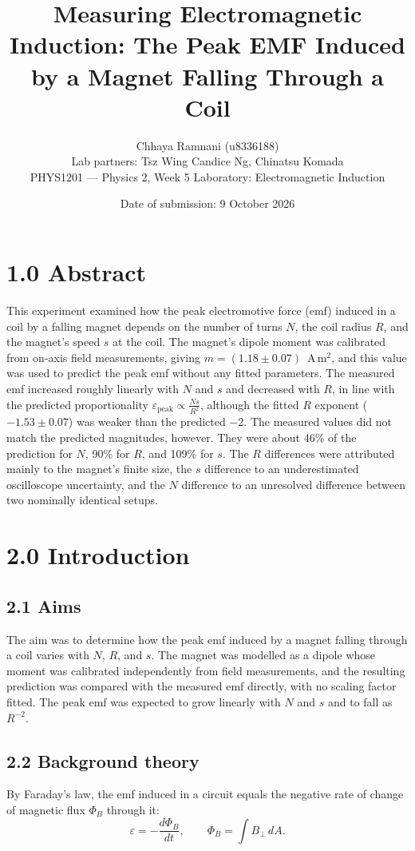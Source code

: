\documentclass[11pt]{article}
\title{\textbf{Measuring Electromagnetic Induction: The Peak EMF Induced by a Magnet Falling Through a Coil}}
\author{Chhaya Ramnani (u8336188)\\ \small Lab partners: Tsz Wing Candice Ng, Chinatsu Komada\\ \small PHYS1201 --- Physics 2, Week 5 Laboratory: Electromagnetic Induction}
\date{Date of submission: 9 October 2026}
\begin{document}
\maketitle
\thispagestyle{empty}

\section*{1.0 Abstract}
This experiment examined how the peak electromotive force (emf) induced in a coil by a falling magnet depends on the number of turns $N$, the coil radius $R$, and the magnet's speed $s$ at the coil. The magnet's dipole moment was calibrated from on-axis field measurements, giving $m = (1.18 \pm 0.07)$~A\,m$^2$, and this value was used to predict the peak emf without any fitted parameters. The measured emf increased roughly linearly with $N$ and $s$ and decreased with $R$, in line with the predicted proportionality $\varepsilon_{\text{peak}} \propto \frac{Ns}{R^2}$, although the fitted $R$ exponent ($-1.53 \pm 0.07$) was weaker than the predicted $-2$. The measured values did not match the predicted magnitudes, however. They were about 46\% of the prediction for $N$, 90\% for $R$, and 109\% for $s$. The $R$ differences were attributed mainly to the magnet's finite size, the $s$ difference to an underestimated oscilloscope uncertainty, and the $N$ difference to an unresolved difference between two nominally identical setups.

\section*{2.0 Introduction}

\subsection*{2.1 Aims}
The aim was to determine how the peak emf induced by a magnet falling through a coil varies with $N$, $R$, and $s$. The magnet was modelled as a dipole whose moment was calibrated independently from field measurements, and the resulting prediction was compared with the measured emf directly, with no scaling factor fitted. The peak emf was expected to grow linearly with $N$ and $s$ and to fall as $R^{-2}$.

\subsection*{2.2 Background theory}
By Faraday's law, the emf induced in a circuit equals the negative rate of change of magnetic flux $\Phi_B$ through it:
\begin{equation}
\varepsilon = -\frac{d\Phi_B}{dt}, \qquad \Phi_B = \int B_\perp \, dA .
\end{equation}
\end{document}
